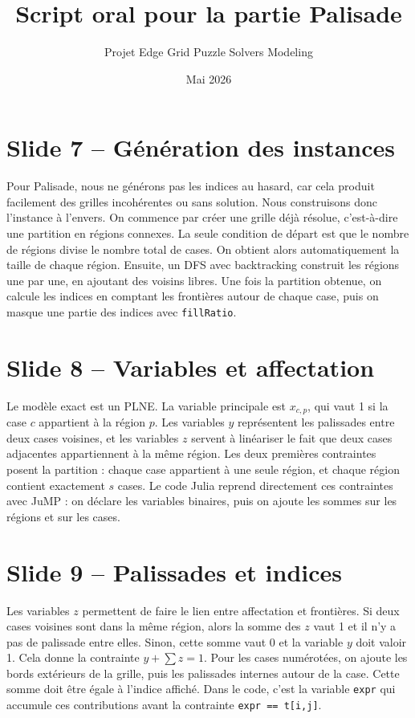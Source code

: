 \documentclass[11pt,a4paper]{article}
\title{Script oral pour la partie Palisade}
\author{Projet Edge Grid Puzzle Solvers Modeling}
\date{Mai 2026}
\begin{document}
\maketitle

\section*{Slide 7 -- Génération des instances}

Pour Palisade, nous ne générons pas les indices au hasard, car cela produit facilement des grilles incohérentes ou sans solution. Nous construisons donc l'instance à l'envers. On commence par créer une grille déjà résolue, c'est-à-dire une partition en régions connexes. La seule condition de départ est que le nombre de régions divise le nombre total de cases. On obtient alors automatiquement la taille de chaque région. Ensuite, un DFS avec backtracking construit les régions une par une, en ajoutant des voisins libres. Une fois la partition obtenue, on calcule les indices en comptant les frontières autour de chaque case, puis on masque une partie des indices avec \texttt{fillRatio}.

\section*{Slide 8 -- Variables et affectation}

Le modèle exact est un PLNE. La variable principale est \(x_{c,p}\), qui vaut 1 si la case \(c\) appartient à la région \(p\). Les variables \(y\) représentent les palissades entre deux cases voisines, et les variables \(z\) servent à linéariser le fait que deux cases adjacentes appartiennent à la même région. Les deux premières contraintes posent la partition : chaque case appartient à une seule région, et chaque région contient exactement \(s\) cases. Le code Julia reprend directement ces contraintes avec JuMP : on déclare les variables binaires, puis on ajoute les sommes sur les régions et sur les cases.

\section*{Slide 9 -- Palissades et indices}

Les variables \(z\) permettent de faire le lien entre affectation et frontières. Si deux cases voisines sont dans la même région, alors la somme des \(z\) vaut 1 et il n'y a pas de palissade entre elles. Sinon, cette somme vaut 0 et la variable \(y\) doit valoir 1. Cela donne la contrainte \(y+\sum z=1\). Pour les cases numérotées, on ajoute les bords extérieurs de la grille, puis les palissades internes autour de la case. Cette somme doit être égale à l'indice affiché. Dans le code, c'est la variable \texttt{expr} qui accumule ces contributions avant la contrainte \texttt{expr == t[i,j]}.
\end{document}
